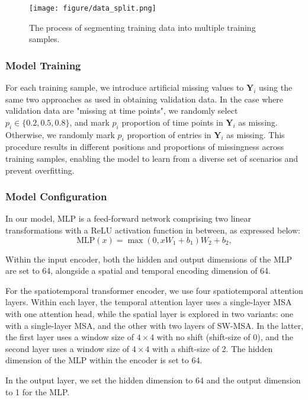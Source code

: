 \documentclass[11pt]{article}
\begin{document}
\begin{figure}[H]
\centering
\texttt{[image: figure/data\_split.png]}
\caption{ The process of segmenting training data into multiple training samples.}
\label{fig: data_split}
\end{figure}




\subsubsection*{Model Training}
For each training sample, we introduce artificial missing values to $\boldsymbol{Y}_i$ using the same two approaches as used in obtaining validation data. In the case where validation data are "missing at time points", we randomly select $p_i \in \{0.2, 0.5, 0.8\}$, and mark $p_i$ proportion of time points in $\boldsymbol{Y}_i$ as missing. Otherwise, we randomly mark $p_i$ proportion of entries in $\boldsymbol{Y}_i$ as missing. This procedure results in different positions and proportions of missingness across training samples, enabling the model to learn from a diverse set of scenarios and prevent overfitting.



\subsubsection*{Model Configuration}
In our model, $\text{MLP}$ is a feed-forward network comprising two linear transformations with a ReLU activation function in between, as expressed below:
\begin{equation}
    \text{MLP}(x)= \max (0, xW_1+b_1)W_2+b_2,
\end{equation}

Within the input encoder, both the hidden and output dimensions of the MLP are set to 64, alongside a spatial and temporal encoding dimension of 64. 

For the spatiotemporal transformer encoder, we use four spatiotemporal attention layers. Within each layer, the temporal attention layer uses a single-layer MSA with one attention head, while the spatial layer is explored in two variants: one with a single-layer MSA, and the other with two layers of SW-MSA. In the latter, the first layer uses a window size of $4\times 4$ with no shift (shift-size of 0), and the second layer uses a window size of $4 \times 4$ with a shift-size of 2. The hidden dimension of the MLP within the encoder is set to 64. 

In the output layer, we set the hidden dimension to 64 and the output dimension to 1 for the MLP. 
\end{document}
